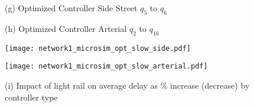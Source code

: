\begin{figure*}[t!]
\vspace{-3mm}

\begin{subfigure}{0.49\textwidth}
  \centering
  \footnotesize{(g) Optimized Controller Side Street $q_5$ to $q_6$}
\end{subfigure}
\begin{subfigure}{0.49\textwidth}
  \centering
  \footnotesize{(h) Optimized Controller Arterial $q_2$ to $q_{10}$}
\end{subfigure}
\begin{subfigure}{0.49\textwidth}
\texttt{[image: network1\_microsim\_opt\_slow\_side.pdf]}
 \label{fig:microsim1:adapt:side}
\end{subfigure}
\begin{subfigure}{0.49\textwidth}
\texttt{[image: network1\_microsim\_opt\_slow\_arterial.pdf]}
 \label{fig:microsim1:adapt:arterial}
\end{subfigure}
%
\begin{subfigure}{1.0\textwidth}
\centering
  \footnotesize{(i) Impact of light rail on average delay as \% increase (decrease) by controller type}
  

\end{subfigure}
\end{figure*}
